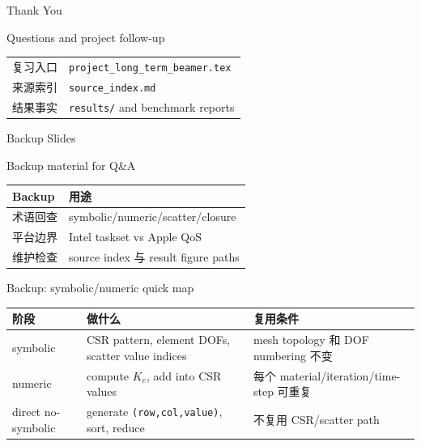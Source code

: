 \documentclass[UTF8,aspectratio=169,10pt]{ctexbeamer}
\newcommand{\code}[1]{\texttt{#1}}
\begin{document}
\begin{frame}{Thank You}
\begin{center}
{\Large Questions and project follow-up}

\vspace{1.0em}
\begin{tabular}{ll}
\toprule
复习入口 & \code{project\_long\_term\_beamer.tex} \\
来源索引 & \code{source\_index.md} \\
结果事实 & \code{results/} and benchmark reports \\
\bottomrule
\end{tabular}
\end{center}
\end{frame}

\appendix

\begin{frame}{Backup Slides}
\begin{center}
{\Large Backup material for Q\&A}

\vspace{0.8em}
\begin{tabular}{ll}
\toprule
Backup & 用途 \\
\midrule
术语回查 & symbolic/numeric/scatter/closure \\
平台边界 & Intel taskset vs Apple QoS \\
维护检查 & source index 与 result figure paths \\
\bottomrule
\end{tabular}
\end{center}
\end{frame}

\begin{frame}{Backup: symbolic/numeric quick map}
\begin{center}
\begin{tabularx}{0.92\textwidth}{lXX}
\toprule
阶段 & 做什么 & 复用条件 \\
\midrule
symbolic & CSR pattern, element DOFs, scatter value indices & mesh topology 和 DOF numbering 不变 \\
numeric & compute $K_e$, add into CSR values & 每个 material/iteration/time-step 可重复 \\
direct no-symbolic & generate \code{(row,col,value)}, sort, reduce & 不复用 CSR/scatter path \\
\bottomrule
\end{tabularx}
\end{center}
\end{frame}
\end{document}
